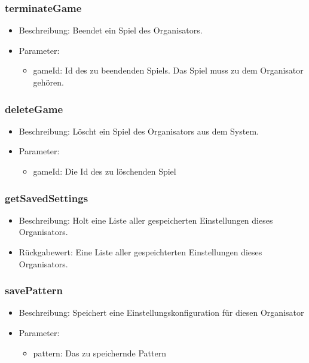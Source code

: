 \documentclass[a4paper]{scrreprt}
\begin{document}
	\subsubsection{terminateGame}
	\begin{itemize}
		\item Beschreibung: Beendet ein Spiel des Organisators.
		\item Parameter:
		\begin{itemize}
			\item gameId: Id des zu beendenden Spiels. Das Spiel muss zu dem Organisator gehören.
		\end{itemize}
	\end{itemize}
	\subsubsection{deleteGame}
	\begin{itemize}
		\item Beschreibung: Löscht ein Spiel des Organisators aus dem System.
		\item Parameter:
		\begin{itemize}
			\item gameId: Die Id des zu löschenden Spiel
		\end{itemize}
	\end{itemize}
	\subsubsection{getSavedSettings}
	\begin{itemize}
		\item Beschreibung: Holt eine Liste aller gespeicherten Einstellungen dieses Organisators.
		\item Rückgabewert: Eine Liste aller gespeichterten Einstellungen dieses Organisators.
	\end{itemize}
	\subsubsection{savePattern}
	\begin{itemize}
		\item Beschreibung: Speichert eine Einstellungskonfiguration für diesen Organisator
		\item Parameter:
		\begin{itemize}
			\item pattern: Das zu speichernde Pattern
		\end{itemize}
	\end{itemize}
\end{document}
